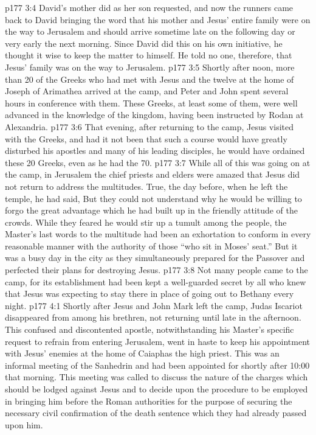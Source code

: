 \vs p177 3:4 David’s mother did as her son requested, and now the runners came back to David bringing the word that his mother and Jesus’ entire family were on the way to Jerusalem and should arrive sometime late on the following day or very early the next morning. Since David did this on his own initiative, he thought it wise to keep the matter to himself. He told no one, therefore, that Jesus’ family was on the way to Jerusalem.
\vs p177 3:5 \pc Shortly after noon, more than 20 of the Greeks who had met with Jesus and the twelve at the home of Joseph of Arimathea arrived at the camp, and Peter and John spent several hours in conference with them. These Greeks, at least some of them, were well advanced in the knowledge of the kingdom, having been instructed by Rodan at Alexandria.
\vs p177 3:6 That evening, after returning to the camp, Jesus visited with the Greeks, and had it not been that such a course would have greatly disturbed his apostles and many of his leading disciples, he would have ordained these 20 Greeks, even as he had the 70.
\vs p177 3:7 \pc While all of this was going on at the camp, in Jerusalem the chief priests and elders were amazed that Jesus did not return to address the multitudes. True, the day before, when he left the temple, he had said,  But they could not understand why he would be willing to forgo the great advantage which he had built up in the friendly attitude of the crowds. While they feared he would stir up a tumult among the people, the Master’s last words to the multitude had been an exhortation to conform in every reasonable manner with the authority of those “who sit in Moses’ seat.” But it was a busy day in the city as they simultaneously prepared for the Passover and perfected their plans for destroying Jesus.
\vs p177 3:8 \pc Not many people came to the camp, for its establishment had been kept a well\hyp{}guarded secret by all who knew that Jesus was expecting to stay there in place of going out to Bethany every night.
\vs p177 4:1 Shortly after Jesus and John Mark left the camp, Judas Iscariot disappeared from among his brethren, not returning until late in the afternoon. This confused and discontented apostle, notwithstanding his Master’s specific request to refrain from entering Jerusalem, went in haste to keep his appointment with Jesus’ enemies at the home of Caiaphas the high priest. This was an informal meeting of the Sanhedrin and had been appointed for shortly after 10:00 that morning. This meeting was called to discuss the nature of the charges which should be lodged against Jesus and to decide upon the procedure to be employed in bringing him before the Roman authorities for the purpose of securing the necessary civil confirmation of the death sentence which they had already passed upon him.
